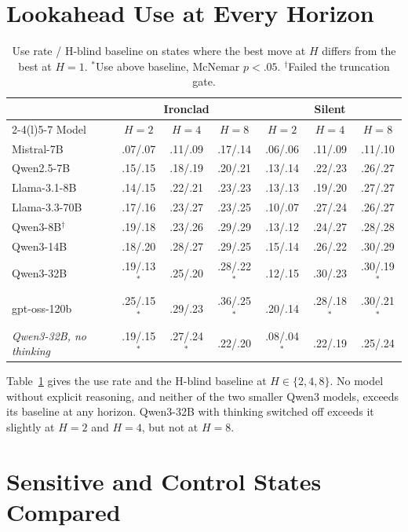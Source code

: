 \section{Lookahead Use at Every Horizon}
\label{app:curves}

\begin{table}[t]
\centering
\small
\begin{tabular}{@{}lcccccc@{}}
\toprule
& \multicolumn{3}{c}{Ironclad} & \multicolumn{3}{c}{Silent} \\
\cmidrule(lr){2-4}\cmidrule(l){5-7}
Model & $H{=}2$ & $H{=}4$ & $H{=}8$ & $H{=}2$ & $H{=}4$ & $H{=}8$ \\
\midrule
Mistral-7B & .07/.07 & .11/.09 & .17/.14 & .06/.06 & .11/.09 & .11/.10 \\
Qwen2.5-7B & .15/.15 & .18/.19 & .20/.21 & .13/.14 & .22/.23 & .26/.27 \\
Llama-3.1-8B & .14/.15 & .22/.21 & .23/.23 & .13/.13 & .19/.20 & .27/.27 \\
Llama-3.3-70B & .17/.16 & .23/.27 & .23/.25 & .10/.07 & .27/.24 & .26/.27 \\
Qwen3-8B$^\dagger$ & .19/.18 & .23/.26 & .29/.29 & .13/.12 & .24/.27 & .28/.28 \\
Qwen3-14B & .18/.20 & .28/.27 & .29/.25 & .15/.14 & .26/.22 & .30/.29 \\
Qwen3-32B & .19/.13$^*$ & .25/.20 & .28/.22$^*$ & .12/.15 & .30/.23 & .30/.19$^*$ \\
gpt-oss-120b & .25/.15$^*$ & .29/.23 & .36/.25$^*$ & .20/.14 & .28/.18$^*$ & .30/.21$^*$ \\
\midrule
\textit{Qwen3-32B, no thinking} & .19/.15$^*$ & .27/.24$^*$ & .22/.20 & .08/.04$^*$ & .22/.19 & .25/.24 \\
\bottomrule
\end{tabular}
\caption{Use rate / H-blind baseline on states where the best move at $H$ differs from the best at $H{=}1$. $^*$Use above baseline, McNemar $p<.05$. $^\dagger$Failed the truncation gate.}
\label{tab:curves}
\end{table}

Table~\ref{tab:curves} gives the use rate and the H-blind baseline at $H \in \{2,4,8\}$. No model without explicit reasoning, and neither of the two smaller Qwen3 models, exceeds its baseline at any horizon. Qwen3-32B with thinking switched off exceeds it slightly at $H{=}2$ and $H{=}4$, but not at $H{=}8$.

\section{Sensitive and Control States Compared}
\label{app:props}

